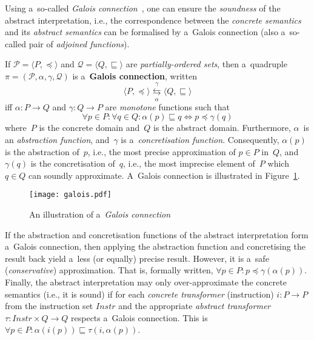 Using a~so-called \emph{Galois connection}~\cite{AILatticeModelCousot, wideningNarrowingCousot, savAI, staticAnalysisMoller, programAnalysisNielson, staticAnalysisRival}, one can ensure the \emph{soundness} of the abstract interpretation, i.e., the correspondence between the \emph{concrete semantics} and its \emph{abstract semantics} can be formalised by a~Galois connection (also a~so-called pair of \emph{adjoined functions}).
\begin{definition}
    If $ \mathcal{P} = \langle P, \preceq \rangle $ and $ \mathcal{Q} = \langle Q, \sqsubseteq \rangle $ are \emph{partially-ordered sets}, then a~quadruple $ \pi = (\mathcal{P}, \alpha, \gamma, \mathcal{Q}) $ is a~\textbf{Galois connection}, written 
    $$ 
        \langle P, \preceq \rangle \overset{\gamma}{\underset{\alpha}\leftrightarrows} \langle Q, \sqsubseteq \rangle
    $$
    iff $ \alpha : P \rightarrow Q $ and $ \gamma : Q \rightarrow P $ are \emph{monotone} functions such that
    $$
        \forall p \in P : \forall q \in Q : \alpha(p) \sqsubseteq q \Longleftrightarrow p \preceq \gamma(q)
    $$
    where~$ P $ is the concrete domain and~$ Q $ is the abstract domain. Furthermore, $ \alpha $~is an \emph{abstraction function}, and~$ \gamma $ is a~\emph{concretisation function}. Consequently, $ \alpha(p) $ is the abstraction of~$ p $, i.e., the most precise approximation of $ p \in P $ in~$ Q $, and $ \gamma(q) $ is the concretisation of~$ q $, i.e., the most imprecise element of~$ P $ which $ q \in Q $ can soundly approximate. A~Galois connection is illustrated in Figure~\ref{fig:galois}.
\end{definition}

\begin{figure}[hbt]
    \centering
    \texttt{[image: galois.pdf]}
    \caption{An illustration of a~\emph{Galois connection}}
    \label{fig:galois}
\end{figure}

If the abstraction and concretisation functions of the abstract interpretation form a~Galois connection, then applying the abstraction function and concretising the result back yield a~less (or equally) precise result. However, it is a~safe (\emph{conservative}) approximation. That is, formally written, $ \forall p \in P : p \preceq \gamma(\alpha(p)) $. Finally, the abstract interpretation may only over-approximate the concrete semantics (i.e., it is sound) if for each \emph{concrete transformer} (instruction) $ i : P \rightarrow P $ from the instruction set $ Instr $ and the appropriate \emph{abstract transformer} $ \tau : Instr \times Q \rightarrow Q $ respects a~Galois connection. This is $ \forall p \in P : \alpha(i(p)) \sqsubseteq \tau(i, \alpha(p)) $.


